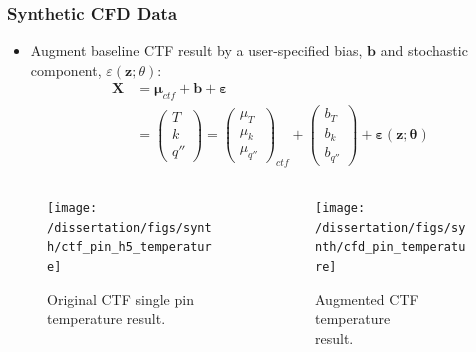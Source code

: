 \documentclass[t, pdftex]{beamer}
\begin{document}
\begin{frame}
\frametitle{Synthetic CFD Data}
\vspace{-18pt}
\begin{itemize}
    \item Augment baseline CTF result by a user-specified bias, $\mathbf b$ and stochastic component, $\varepsilon(\mathbf z; \theta)$:
    \begin{align}
    \mathbf X &= \mathbf \mu_{ctf} + \mathbf b + \mathbf \varepsilon \nonumber \\
    &=
    \begin{pmatrix}
    T \\
    k \\
    q''
    \end{pmatrix}
    =
    \begin{pmatrix}
    \mu_{T} \\
    \mu_k \\
    \mu_{q''}
    \end{pmatrix}_{ctf}
    + \begin{pmatrix}
    b_{T} \\
    b_k \\
    b_{q''}
    \end{pmatrix}
    + \mathbf{\varepsilon} (\mathbf z; \mathbf \theta) \nonumber
    \end{align}
\end{itemize}
\vspace{-20pt}
\begin{columns}
    \begin{column}{0.5\textwidth}
        \begin{figure}[H]%
            \centering
            \texttt{[image: /dissertation/figs/synth/ctf\_pin\_h5\_temperature]}
            \caption{\centering Original CTF single pin \\ temperature result.}%
        \end{figure}
    \end{column}
    \begin{column}{0.5\textwidth}
        \begin{figure}[H]%
            \centering
            \texttt{[image: /dissertation/figs/synth/cfd\_pin\_temperature]}
            \caption{\centering Augmented CTF temperature \\ result.}%
            \label{fig:ctf_twall_aug}%
        \end{figure}
    \end{column}
\end{columns}
\end{frame}
\end{document}
